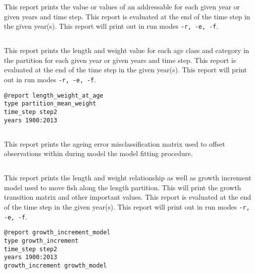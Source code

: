 This report prints the value or values of an addressable for each given year or given years and time step. This report is evaluated at the end of the time step in the given year(s). This report will print out in run modes \texttt{-r, -e, -f}.

\ifAgeBased
\subsection{}\label{sec:Report-AgeLength}\label{sec:Report-LengthWeight}

This report prints the length and weight value for each age class and category in the partition for each given year or given years and time step. This report is evaluated at the end of the time step in the given year(s). This report will print out in run modes \texttt{-r, -e, -f}.

\begin{verbatim}
@report length_weight_at_age
type partition_mean_weight
time_step step2
years 1900:2013
\end{verbatim}

\subsection{}\label{sec:Report-AgeingErrorMatrix}

This report prints the ageing error misclassification matrix used to offset observations within during model the model fitting procedure.

\else
\subsection{}\label{sec:Report-GrowthIncrement}

This report prints the length and weight relationship as well as growth increment model used to move fish along the length partition. This will print the growth transition matrix and other important values. This report is evaluated at the end of the time step in the given year(s). This report will print out in run modes \texttt{-r, -e, -f}.

\begin{verbatim}
@report growth_increment_model
type growth_increment
time_step step2
years 1900:2013
growth_increment growth_model
\end{verbatim}

